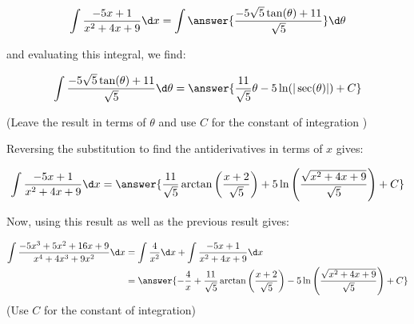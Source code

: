 \documentclass{ximera}
\begin{document}
\begin{exercise}
\begin{exercise}
\begin{exercise}
\begin{exercise}
\[
\int \frac{-5x+1}{x^2+4x+9} \d x =\int   \answer{\frac{-5\sqrt{5}\tan(\theta)+11}{\sqrt{5}}}  \d \theta
\]

and evaluating this integral, we find:


\[
\int   \frac{-5\sqrt{5}\tan(\theta)+11}{\sqrt{5}}  \d \theta = \answer{\frac{11}{\sqrt{5}}\theta -5\ln(|\sec(\theta)|)+C}
\]

(Leave the result in terms of $\theta$ and use $C$ for the constant of integration )

\begin{exercise}

Reversing the substitution to find the antiderivatives in terms of $x$ gives:

\[\int \frac{-5x+1}{x^2+4x+9} \d x =\answer{\frac{11}{\sqrt{5}}\arctan\left(\frac{x+2}{\sqrt{5}}\right)
+ 5\ln\left(\frac{\sqrt{x^2+4x+9}}{\sqrt{5}}\right) + C}
\]

Now, using this result as well as the previous result gives:

\begin{align*}
\int \frac{-5x^3+5x^2+16x+9}{x^{4}+4x^3+9x^2} \d x &= \int \frac{4}{x^2} \d x + \int \frac{-5x+1}{x^2+4x+9} \d x \\
&=\answer{-\frac{4}{x}+\frac{11}{\sqrt{5}}\arctan\left(\frac{x+2}{\sqrt{5}}\right) - 5\ln\left(\frac{\sqrt{x^2+4x+9}}{\sqrt{5}}\right) + C}
\end{align*}
(Use $C$ for the constant of integration)
 

\end{exercise}
\end{exercise}
\end{exercise}
\end{exercise}
\end{exercise}
\end{document}
